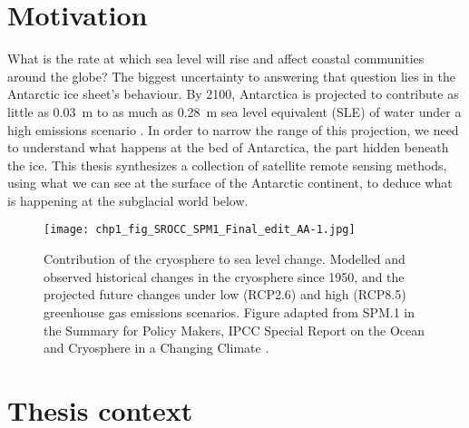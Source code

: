 
\section{Motivation}

What is the rate at which sea level will rise and affect coastal communities around the globe?
The biggest uncertainty to answering that question lies in the Antarctic ice sheet's behaviour.
By 2100, Antarctica is projected to contribute as little as \SI{0.03}{\metre} to as much as \SI{0.28}{\metre} sea level equivalent (\gls{SLE}) of water under a high emissions scenario \citep[RCP 8.5, see Fig.~\ref{fig:0}f)][]{PortnerSummaryPolicymakers2019}.
In order to narrow the range of this projection, we need to understand what happens at the bed of Antarctica, the part hidden beneath the ice.
This thesis synthesizes a collection of satellite remote sensing methods, using what we can see at the surface of the Antarctic continent, to deduce what is happening at the subglacial world below.

\begin{figure}[htbp]
  \texttt{[image: chp1\_fig\_SROCC\_SPM1\_Final\_edit\_AA-1.jpg]}
  \caption[Cryospheric contribution to sea level change by 2100]{
    Contribution of the cryosphere to sea level change.
    Modelled and observed historical changes in the cryosphere since 1950, and the projected future changes under low (RCP2.6) and high (RCP8.5) greenhouse gas emissions scenarios.
    Figure adapted from SPM.1 in the Summary for Policy Makers, IPCC Special Report on the Ocean and Cryosphere in a Changing Climate \citep{PortnerSummaryPolicymakers2019}.
  }
  \label{fig:0}
\end{figure}

\section{Thesis context}

